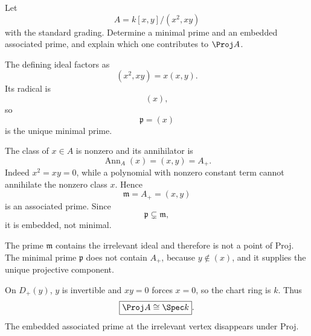 \begin{problem}\label{prob:vi37-20}
Let
\[
A=k[x,y]/(x^2,xy)
\]
with the standard grading. Determine a minimal prime and an embedded associated prime, and explain which one contributes to \(\Proj A\).

\end{problem}

\ifdefined\FullProblemDossiers
\begin{solution}
The defining ideal factors as
\[
(x^2,xy)=x(x,y).
\]
Its radical is
\[
(x),
\]
so
\[
\mathfrak p=(x)
\]
is the unique minimal prime.

The class of \(x\in A\) is nonzero and its annihilator is
\[
\operatorname{Ann}_A(x)=(x,y)=A_+.
\]
Indeed \(x^2=xy=0\), while a polynomial with nonzero constant term cannot annihilate the nonzero class \(x\). Hence
\[
\mathfrak m=A_+=(x,y)
\]
is an associated prime. Since
\[
\mathfrak p\subsetneq\mathfrak m,
\]
it is embedded, not minimal.

The prime \(\mathfrak m\) contains the irrelevant ideal and therefore is not a point of Proj. The minimal prime \(\mathfrak p\) does not contain \(A_+\), because \(y\notin(x)\), and it supplies the unique projective component.

On \(D_+(y)\), \(y\) is invertible and \(xy=0\) forces \(x=0\), so the chart ring is \(k\). Thus
\[
\boxed{\Proj A\cong\Spec k}.
\]
The embedded associated prime at the irrelevant vertex disappears under Proj.
\end{solution}
\fi
